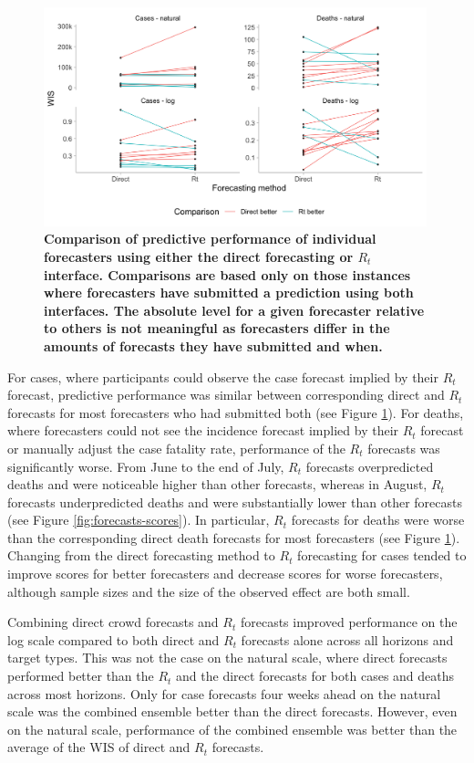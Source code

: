 \documentclass[10pt,a4paper,twocolumn]{article}
\begin{document}
\begin{figure}
\centering
\includegraphics[width=0.99\textwidth]{../output/figures/comparison-direct-rt-individual.png}
\caption{\bf{Comparison of predictive performance of individual forecasters using either the direct forecasting or $R_t$ interface}. Comparisons are based only on those instances where forecasters have submitted a prediction using both interfaces. The absolute level for a given forecaster relative to others is not meaningful as forecasters differ in the amounts of forecasts they have submitted and when.}
\label{fig:comparison-direct-rt-individual}
\end{figure}
For cases, where participants could observe the case forecast implied by their $R_t$ forecast, predictive performance was similar between corresponding direct and $R_t$ forecasts for most forecasters who had submitted both (see Figure \ref{fig:comparison-direct-rt-individual}). For deaths, where forecasters could not see the incidence forecast implied by their $R_t$ forecast or manually adjust the case fatality rate, performance of the $R_t$ forecasts was significantly worse. From June to the end of July, $R_t$ forecasts overpredicted deaths and were noticeable higher than other forecasts, whereas in August, $R_t$ forecasts underpredicted deaths and were substantially lower than other forecasts (see Figure \ref{fig:forecasts-scores}). In particular, $R_t$ forecasts for deaths were worse than the corresponding direct death forecasts for most forecasters (see Figure \ref{fig:comparison-direct-rt-individual}). Changing from the direct forecasting method to $R_t$ forecasting for cases tended to improve scores for better forecasters and decrease scores for worse forecasters, although sample sizes and the size of the observed effect are both small. 

Combining direct crowd forecasts and $R_t$ forecasts improved performance on the log scale compared to both direct and $R_t$ forecasts alone across all horizons and target types. This was not the case on the natural scale, where direct forecasts performed better than the $R_t$ and the direct forecasts for both cases and deaths across most horizons. Only for case forecasts four weeks ahead on the natural scale was the combined ensemble better than the direct forecasts. However, even on the natural scale, performance of the combined ensemble was better than the average of the WIS of direct and $R_t$ forecasts. 
\end{document}
